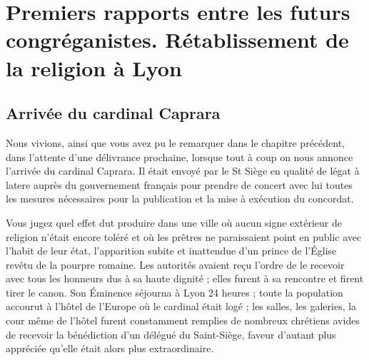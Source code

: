 \chapter{Premiers rapports entre les futurs congréganistes. Rétablissement de la religion à Lyon}

\section*{Arrivée du cardinal Caprara}
Nous vivions, ainsi que vous avez pu le remarquer dans le chapitre précédent, dans l'attente d'une délivrance prochaine, lorsque tout à coup on nous annonce l'arrivée du cardinal Caprara. Il était envoyé par le St Siège en qualité de légat à latere auprès du gouvernement français pour prendre de concert avec lui toutes les mesures nécessaires pour la publication et la mise à exécution du concordat.

Vous jugez quel effet dut produire dans une ville où aucun signe extérieur de religion n'était encore toléré et où les prêtres ne paraissaient point en public avec l'habit de leur état, l'apparition subite et inattendue d'un prince de l'Église revêtu de la pourpre romaine. Les autorités avaient reçu l'ordre de le recevoir avec tous les honneurs dus à sa haute dignité ; elles furent à sa rencontre et firent tirer le canon. Son Éminence séjourna à Lyon 24 heures ; toute la population accourut à l'hôtel de l'Europe où le cardinal était logé ; les salles, les galeries, la cour même de l'hôtel furent constamment remplies de nombreux chrétiens avides de recevoir la bénédiction d'un délégué du Saint-Siège, faveur d'autant plus appréciée qu'elle était alors plus extraordinaire.

